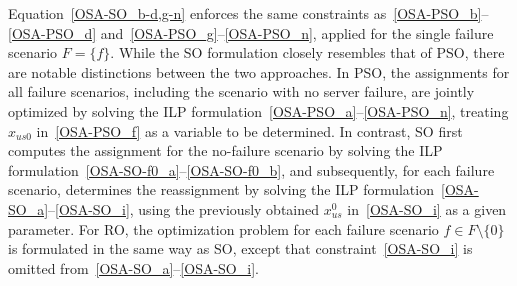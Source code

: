 \documentclass[conference]{IEEEtran}
\begin{document}
\begin{CJK}{UTF8}{ipxm}
Equation~\eqref{OSA-SO_b-d,g-n} enforces the same constraints as~\eqref{OSA-PSO_b}--\eqref{OSA-PSO_d} and~\eqref{OSA-PSO_g}--\eqref{OSA-PSO_n}, applied for the single failure scenario $F = \{f\}$.
While the SO formulation closely resembles that of PSO, there are notable distinctions between the two approaches.
In PSO, the assignments for all failure scenarios, including the scenario with no server failure, are jointly optimized by solving the ILP formulation~\eqref{OSA-PSO_a}--\eqref{OSA-PSO_n}, treating $x_{us0}$ in~\eqref{OSA-PSO_f} as a variable to be determined.
In contrast, SO first computes the assignment for the no-failure scenario by solving the ILP formulation~\eqref{OSA-SO-f0_a}--\eqref{OSA-SO-f0_b}, and subsequently, for each failure scenario, determines the reassignment by solving the ILP formulation~\eqref{OSA-SO_a}--\eqref{OSA-SO_i}, using the previously obtained $x^0_{us}$ in~\eqref{OSA-SO_i} as a given parameter.
For RO, the optimization problem for each failure scenario $f \in F \setminus \{0\}$ is formulated in the same way as SO, except that constraint~\eqref{OSA-SO_i} is omitted from~\eqref{OSA-SO_a}--\eqref{OSA-SO_i}.


\end{CJK}
\end{document}
